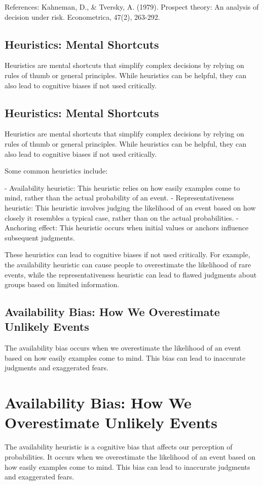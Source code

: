\documentclass{report}%
\begin{document}
References:
Kahneman, D., \& Tversky, A. (1979). Prospect theory: An analysis of decision under risk. Econometrica, 47(2), 263-292.%
\section{Heuristics: Mental Shortcuts}%
Heuristics are mental shortcuts that simplify complex decisions by relying on rules of thumb or general principles. While heuristics can be helpful, they can also lead to cognitive biases if not used critically.

%
\section{Heuristics: Mental Shortcuts}
Heuristics are mental shortcuts that simplify complex decisions by relying on rules of thumb or general principles. While heuristics can be helpful, they can also lead to cognitive biases if not used critically.

Some common heuristics include:

- Availability heuristic: This heuristic relies on how easily examples come to mind, rather than the actual probability of an event.
- Representativeness heuristic: This heuristic involves judging the likelihood of an event based on how closely it resembles a typical case, rather than on the actual probabilities.
- Anchoring effect: This heuristic occurs when initial values or anchors influence subsequent judgments.

These heuristics can lead to cognitive biases if not used critically. For example, the availability heuristic can cause people to overestimate the likelihood of rare events, while the representativeness heuristic can lead to flawed judgments about groups based on limited information.%
\section{Availability Bias: How We Overestimate Unlikely Events}%
The availability bias occurs when we overestimate the likelihood of an event based on how easily examples come to mind. This bias can lead to inaccurate judgments and exaggerated fears.

%
\chapter{Availability Bias: How We Overestimate Unlikely Events}

The availability heuristic is a cognitive bias that affects our perception of probabilities. It occurs when we overestimate the likelihood of an event based on how easily examples come to mind. This bias can lead to inaccurate judgments and exaggerated fears.
\end{document}
